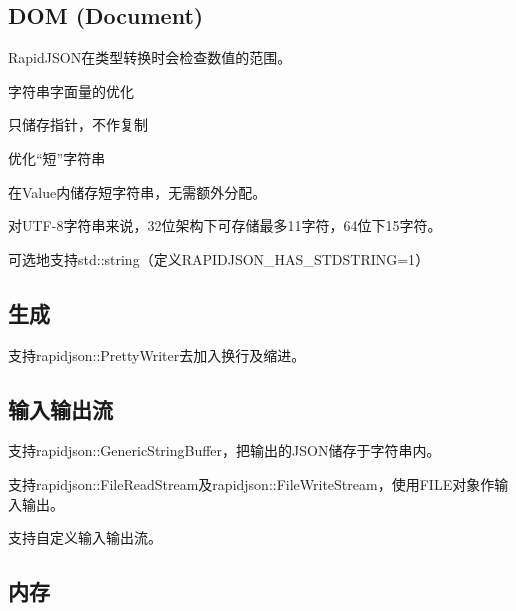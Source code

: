 \subsection*{D\+OM (Document)}


\begin{DoxyItemize}
\item Rapid\+J\+S\+O\+N在类型转换时会检查数值的范围。
\item 字符串字面量的优化
\begin{DoxyItemize}
\item 只储存指针，不作复制
\end{DoxyItemize}
\item 优化“短”字符串
\begin{DoxyItemize}
\item 在{\ttfamily Value}内储存短字符串，无需额外分配。
\item 对\+U\+T\+F-\/8字符串来说，32位架构下可存储最多11字符，64位下15字符。
\end{DoxyItemize}
\item 可选地支持{\ttfamily std\+::string}（定义{\ttfamily R\+A\+P\+I\+D\+J\+S\+O\+N\+\_\+\+H\+A\+S\+\_\+\+S\+T\+D\+S\+T\+R\+I\+NG=1}）
\end{DoxyItemize}

\subsection*{生成}


\begin{DoxyItemize}
\item 支持{\ttfamily rapidjson\+::\+Pretty\+Writer}去加入换行及缩进。
\end{DoxyItemize}

\subsection*{输入输出流}


\begin{DoxyItemize}
\item 支持{\ttfamily rapidjson\+::\+Generic\+String\+Buffer}，把输出的\+J\+S\+O\+N储存于字符串内。
\item 支持{\ttfamily rapidjson\+::\+File\+Read\+Stream}及{\ttfamily rapidjson\+::\+File\+Write\+Stream}，使用{\ttfamily F\+I\+LE}对象作输入输出。
\item 支持自定义输入输出流。
\end{DoxyItemize}

\subsection*{内存}


